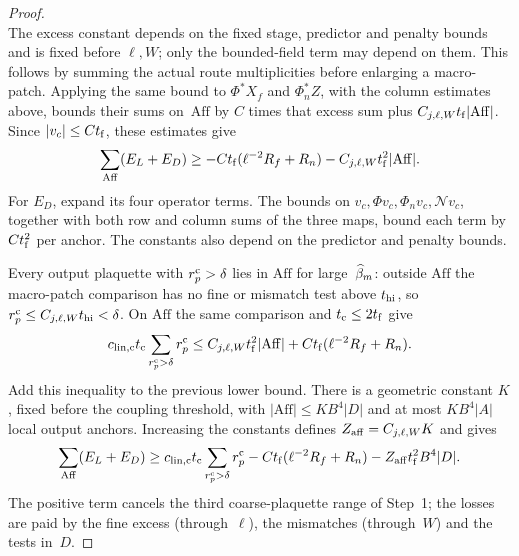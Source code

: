\begin{proof}
\begin{equation*}
\end{equation*}
The excess constant depends on the fixed stage, predictor and penalty bounds and is fixed before $\ell,W$; only the bounded-field term may depend on them. This follows by summing the actual route multiplicities before enlarging a macro-patch. Applying the same bound to $\Phi^*X_f$ and $\Phi_n^*Z$, with the column estimates above, bounds their sums on~$\mathrm{Aff}$ by $C$ times that excess sum plus $C_{j,\ell,W}t_{\rm f}|\mathrm{Aff}|$. Since $|v_c|\le Ct_{\rm f}$, these estimates give
\begin{equation*}
\sum_{\mathrm{Aff}}(E_L+E_D)\ge-Ct_{\rm f}(\ell^{-2}R_f+R_n)-C_{j,\ell,W}t_{\rm f}^2|\mathrm{Aff}|.
\end{equation*}
For $E_D$, expand its four operator terms. The bounds on $v_c,\Phi v_c,\Phi_nv_c,\mathcal Nv_c$, together with both row and column sums of the three maps, bound each term by $Ct_{\rm f}^2$ per anchor. The constants also depend on the predictor and penalty bounds.

Every output plaquette with $r^{\rm c}_p>\delta$ lies in $\mathrm{Aff}$ for large~$\widehat{\beta}_m$: outside $\mathrm{Aff}$ the macro-patch comparison has no fine or mismatch test above $t_{\rm hi}$, so $r^{\rm c}_p\le C_{j,\ell,W}t_{\rm hi}<\delta$. On $\mathrm{Aff}$ the same comparison and $t_{\rm c}\le2t_{\rm f}$ give
\begin{equation*}
c_{{\rm lin},{\rm c}}t_{\rm c}\sum_{r^{\rm c}_p>\delta}r^{\rm c}_p
\le C_{j,\ell,W}t_{\rm f}^2|\mathrm{Aff}|+Ct_{\rm f}(\ell^{-2}R_f+R_n).
\end{equation*}
Add this inequality to the previous lower bound. There is a geometric constant $K$, fixed before the coupling threshold, with $|\mathrm{Aff}|\le KB^4|D|$ and at most $KB^4|A|$ local output anchors. Increasing the constants defines $Z_{\rm aff}=C_{j,\ell,W}K$ and gives
\begin{equation*}
\sum_{\mathrm{Aff}}(E_L+E_D)\ge c_{{\rm lin},{\rm c}}t_{\rm c}\sum_{r^{\rm c}_p>\delta}r^{\rm c}_p
-Ct_{\rm f}(\ell^{-2}R_f+R_n)-Z_{\rm aff}t_{\rm f}^2B^4|D|.
\end{equation*}
The positive term cancels the third coarse-plaquette range of Step~1; the losses are paid by the fine excess (through~$\ell$), the mismatches (through~$W$) and the tests in~$D$.


\end{proof}
